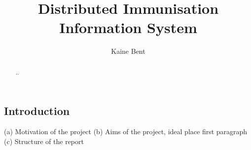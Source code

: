 \documentclass{report}
\title{Distributed Immunisation Information System}
\author{Kaine Bent}
\begin{document}
\begin{titlepage}
\maketitle
\end{titlepage}

\begin{abstract}
..
\end{abstract}

\begin{flushleft}

\tableofcontents

\listoffigures


\chapter{Introduction} %
(a) Motivation of the project
(b) Aims of the project, ideal place first paragraph
(c) Structure of the report  

\end{flushleft}
\end{document}
